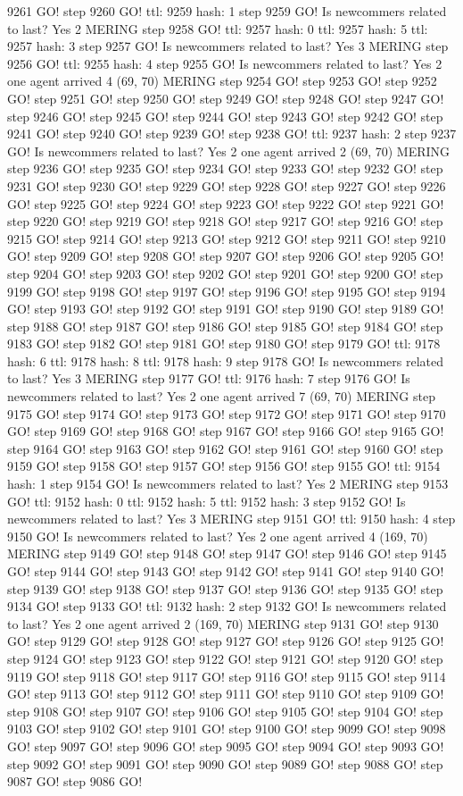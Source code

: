 9261 GO! step 9260 GO! ttl: 9259 hash: 1 step 9259 GO! Is newcommers related to last? Yes 2 MERING step 9258 GO! ttl: 9257 hash: 0 ttl: 9257 hash: 5 ttl: 9257 hash: 3 step 9257 GO! Is newcommers related to last? Yes 3 MERING step 9256 GO! ttl: 9255 hash: 4 step 9255 GO! Is newcommers related to last? Yes 2 one agent arrived 4 (69, 70) MERING step 9254 GO! step 9253 GO! step 9252 GO! step 9251 GO! step 9250 GO! step 9249 GO! step 9248 GO! step 9247 GO! step 9246 GO! step 9245 GO! step 9244 GO! step 9243 GO! step 9242 GO! step 9241 GO! step 9240 GO! step 9239 GO! step 9238 GO! ttl: 9237 hash: 2 step 9237 GO! Is newcommers related to last? Yes 2 one agent arrived 2 (69, 70) MERING step 9236 GO! step 9235 GO! step 9234 GO! step 9233 GO! step 9232 GO! step 9231 GO! step 9230 GO! step 9229 GO! step 9228 GO! step 9227 GO! step 9226 GO! step 9225 GO! step 9224 GO! step 9223 GO! step 9222 GO! step 9221 GO! step 9220 GO! step 9219 GO! step 9218 GO! step 9217 GO! step 9216 GO! step 9215 GO! step 9214 GO! step 9213 GO! step 9212 GO! step 9211 GO! step 9210 GO! step 9209 GO! step 9208 GO! step 9207 GO! step 9206 GO! step 9205 GO! step 9204 GO! step 9203 GO! step 9202 GO! step 9201 GO! step 9200 GO! step 9199 GO! step 9198 GO! step 9197 GO! step 9196 GO! step 9195 GO! step 9194 GO! step 9193 GO! step 9192 GO! step 9191 GO! step 9190 GO! step 9189 GO! step 9188 GO! step 9187 GO! step 9186 GO! step 9185 GO! step 9184 GO! step 9183 GO! step 9182 GO! step 9181 GO! step 9180 GO! step 9179 GO! ttl: 9178 hash: 6 ttl: 9178 hash: 8 ttl: 9178 hash: 9 step 9178 GO! Is newcommers related to last? Yes 3 MERING step 9177 GO! ttl: 9176 hash: 7 step 9176 GO! Is newcommers related to last? Yes 2 one agent arrived 7 (69, 70) MERING step 9175 GO! step 9174 GO! step 9173 GO! step 9172 GO! step 9171 GO! step 9170 GO! step 9169 GO! step 9168 GO! step 9167 GO! step 9166 GO! step 9165 GO! step 9164 GO! step 9163 GO! step 9162 GO! step 9161 GO! step 9160 GO! step 9159 GO! step 9158 GO! step 9157 GO! step 9156 GO! step 9155 GO! ttl: 9154 hash: 1 step 9154 GO! Is newcommers related to last? Yes 2 MERING step 9153 GO! ttl: 9152 hash: 0 ttl: 9152 hash: 5 ttl: 9152 hash: 3 step 9152 GO! Is newcommers related to last? Yes 3 MERING step 9151 GO! ttl: 9150 hash: 4 step 9150 GO! Is newcommers related to last? Yes 2 one agent arrived 4 (169, 70) MERING step 9149 GO! step 9148 GO! step 9147 GO! step 9146 GO! step 9145 GO! step 9144 GO! step 9143 GO! step 9142 GO! step 9141 GO! step 9140 GO! step 9139 GO! step 9138 GO! step 9137 GO! step 9136 GO! step 9135 GO! step 9134 GO! step 9133 GO! ttl: 9132 hash: 2 step 9132 GO! Is newcommers related to last? Yes 2 one agent arrived 2 (169, 70) MERING step 9131 GO! step 9130 GO! step 9129 GO! step 9128 GO! step 9127 GO! step 9126 GO! step 9125 GO! step 9124 GO! step 9123 GO! step 9122 GO! step 9121 GO! step 9120 GO! step 9119 GO! step 9118 GO! step 9117 GO! step 9116 GO! step 9115 GO! step 9114 GO! step 9113 GO! step 9112 GO! step 9111 GO! step 9110 GO! step 9109 GO! step 9108 GO! step 9107 GO! step 9106 GO! step 9105 GO! step 9104 GO! step 9103 GO! step 9102 GO! step 9101 GO! step 9100 GO! step 9099 GO! step 9098 GO! step 9097 GO! step 9096 GO! step 9095 GO! step 9094 GO! step 9093 GO! step 9092 GO! step 9091 GO! step 9090 GO! step 9089 GO! step 9088 GO! step 9087 GO! step 9086 GO! 